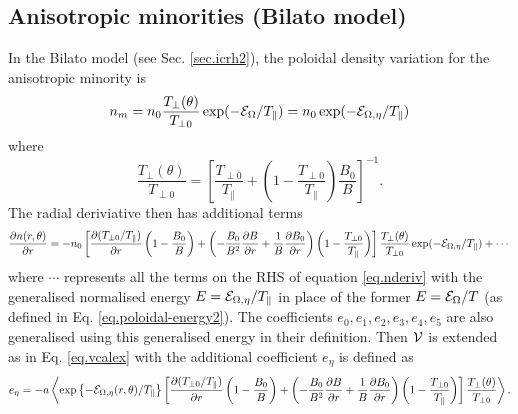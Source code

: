 \subsection{Anisotropic minorities (Bilato model)}
In the Bilato model (see Sec. \ref{sec.icrh2}), the poloidal density variation for the anisotropic minority is
\begin{equation}
 n_m = n_0 \frac{T_{\perp}(\theta)}{T_{\perp 0}} \exp(-{\cal E}_{\Omega}/T_\parallel) = n_0 \exp(-{\cal E}_{\Omega,\eta}/T_\parallel)
\end{equation}
where
\begin{equation}
 \frac{T_{\perp}(\theta)}{T_{\perp 0}} = 
\left [ \frac{T_{\perp 0}}{T_{\parallel}} + \left(1 - \frac{T_{\perp 0}}{T_{\parallel}} \right )\frac{B_{0}}{B} \right ]^{-1}.
\end{equation}
The radial deriviative then has additional terms 
\begin{equation}
\frac{\partial n(r,\theta)}{\partial r} = -n_0
 \left[ \frac{\partial (T_{\perp 0}/T_\parallel)}{\partial r} \left(1- \frac{B_{0}}{B} \right )
+ \left( -\frac{B_{0}}{B^2}\frac{\partial B}{\partial r} 
+ \frac{1}{B}\frac{\partial B_{0}}{\partial r} \right) 
\left(1- \frac{T_{\perp 0}}{T_\parallel}\right)
 \right] \frac{T_\perp(\theta)}{T_{\perp 0}} 
\exp(-{\cal E}_{\Omega,\eta}/T_\parallel) + \cdots
\end{equation}
where $\cdots$ represents all the terms on the RHS of equation \ref{eq.nderiv} with the generalised normalised energy $E = {\cal E}_{\Omega,\eta}/T_\parallel $
in place of the former $E = {\cal E}_{\Omega}/T $ (as defined in Eq. \ref{eq.poloidal-energy2}).  The coefficients $e_0,e_1,e_2,e_3,e_4,e_5$ are also generalised 
using this generalised energy in their definition.
Then $\cal{V}$ is extended as in Eq. \ref{eq.vcalex} with the additional coefficient $e_\eta$ is defined as
\[
e_\eta = -a \left \langle \exp\left\{-{\cal E}_{\Omega,\eta}(r,\theta)/T_\parallel\right\} 
 \left[ \frac{\partial (T_{\perp 0}/T_\parallel)}{\partial r} \left(1- \frac{B_{0}}{B} \right )
+ \left( -\frac{B_{0}}{B^2}\frac{\partial B}{\partial r} 
+ \frac{1}{B}\frac{\partial B_{0}}{\partial r} \right) 
\left(1- \frac{T_{\perp 0}}{T_\parallel}\right)
 \right] \frac{T_\perp(\theta)}{T_{\perp 0}} 
 \right \rangle.
\]

\pagebreak

%

